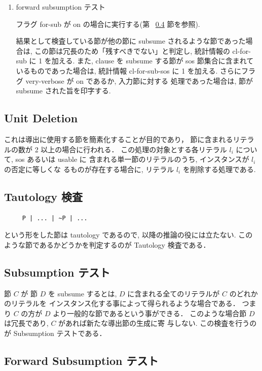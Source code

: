 \begin{enumerate}
\item forward subsumption テスト

  フラグ for-sub が on の場合に実行する(第 ~\ref{sec:forward-subsume}
  節を参照).
  
  結果として検査している節が他の節に subsume されるような節であった場合は,
  この節は冗長のため「残すべきでない」と判定し,
  統計情報の cl-for-sub に 1 を加える. また, clause を subsume する節が
  sos 節集合に含まれているものであった場合は, 統計情報 cl-for-sub-sos に
  1 を加える. さらにフラグ very-verbose が on であるか, 入力節に対する
  処理であった場合は, 節が subsume された旨を印字する.
  
\end{enumerate}


\subsection{Unit Deletion}
\label{sec:unit-deletion}

これは導出に使用する節を簡素化することが目的であり，
節に含まれるリテラルの数が 2 以上の場合に行われる．
この処理の対象とする各リテラル $l_i$ について, sos あるいは usable に
含まれる単一節のリテラルのうち, インスタンスが $l_i$ の否定に等しくな
るものが存在する場合に, リテラル $l_i$ を削除する処理である.

\subsection{Tautology 検査}
\label{sec:cl-tautology?}

\begin{verbatim}
     P | ... | ~P | ...
\end{verbatim}
という形をした節は tautology であるので, 以降の推論の役には立たない. 
このような節であるかどうかを判定するのが Tautology 検査である．

\subsection{Subsumption テスト}
\label{sec:subsume?}

節 $C$ が 節 $D$ を subsume するとは, 
$D$ に含まれる全てのリテラルが $C$ のどれかのリテラルを
インスタンス化する事によって得られるような場合である．
つまり $C$ の方が $D$ より一般的な節であるという事ができる．
このような場合節 $D$ は冗長であり, $C$ があれば新たな導出節の生成に寄
与しない.
この検査を行うのが Subsumption テストである．

\subsection{Forward Subsumption テスト}
\label{sec:forward-subsume}

